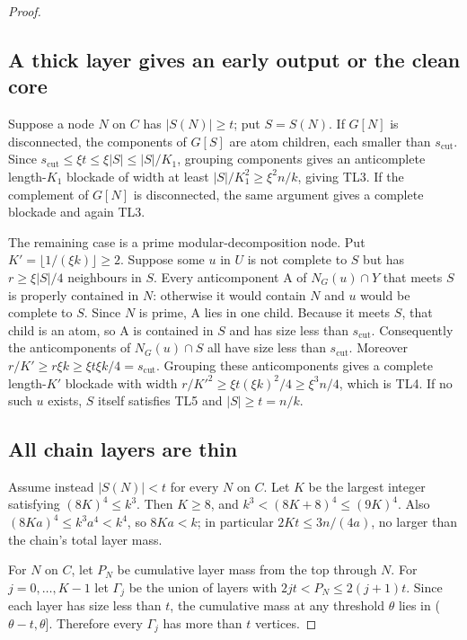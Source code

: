 \documentclass[11pt,a4paper]{article}
\theoremstyle{definition}
\theoremstyle{remark}
\numberwithin{equation}{section}
\begin{document}
\begin{proof}
\subsection{A thick layer gives an early output or the clean core}
Suppose a node \(N\) on \(C\) has \(|S(N)|\ge\allowbreak t\); put \(S=S(N)\). If \(G[N]\) is disconnected, the components of \(G[S]\) are atom children, each smaller than \(s_{\mathrm{cut}}\). Since \(s_{\mathrm{cut}}\le\allowbreak \xi t\le\allowbreak \xi|S|\le\allowbreak |S|/K_{1}\), grouping components gives an anticomplete length-\(K_{1}\) blockade of width at least \(|S|/K_{1}^{2}\ge\allowbreak \xi^{2} n/k\), giving TL3. If the complement of \(G[N]\) is disconnected, the same argument gives a complete blockade and again TL3.

The remaining case is a prime modular-decomposition node. Put \(K'=\lfloor 1/(\xi k)\rfloor\ge\allowbreak 2\). Suppose some \(u\) in \(U\) is not complete to \(S\) but has \(r\ge\allowbreak \xi|S|/4\) neighbours in \(S\). Every anticomponent A of \(N_{G}(u) \cap  Y\) that meets \(S\) is properly contained in \(N\): otherwise it would contain \(N\) and \(u\) would be complete to \(S\). Since \(N\) is prime, A lies in one child. Because it meets \(S\), that child is an atom, so A is contained in \(S\) and has size less than \(s_{\mathrm{cut}}\). Consequently the anticomponents of \(N_{G}(u) \cap  S\) all have size less than \(s_{\mathrm{cut}}\). Moreover \(r/K'\ge\allowbreak r \xi k\ge\allowbreak \xi t \xi k/4=s_{\mathrm{cut}}\). Grouping these anticomponents gives a complete length-\(K'\) blockade with width \(r/K'^{2}\ge\allowbreak \xi t(\xi k)^{2}/4\ge\allowbreak \xi^{3} n/4\), which is TL4. If no such \(u\) exists, \(S\) itself satisfies TL5 and \(|S|\ge\allowbreak t=n/k\).
\subsection{All chain layers are thin}
Assume instead \(|S(N)|<t\) for every \(N\) on \(C\). Let \(K\) be the largest integer satisfying \((8K)^{4}\le\allowbreak k^{3}\). Then \(K\ge\allowbreak 8\), and \(k^{3}<(8K+8)^{4}\le\allowbreak (9K)^{4}\). Also \((8Ka)^{4}\le\allowbreak k^{3}a^{4}<k^{4}\), so \(8Ka<k\); in particular \(2Kt\le 3n/(4a)\), no larger than the chain's total layer mass.

For \(N\) on \(C\), let \(P_{N}\) be cumulative layer mass from the top through \(N\). For \(j=0,\ldots,K-1\) let \(\Gamma_{j}\) be the union of layers with \(2jt<P_{N}\le 2(j+1)t\). Since each layer has size less than \(t\), the cumulative mass at any threshold \(\theta\) lies in (\(\theta-t,\allowbreak \theta\)]. Therefore every \(\Gamma_{j}\) has more than \(t\) vertices.


\end{proof}
\end{document}
